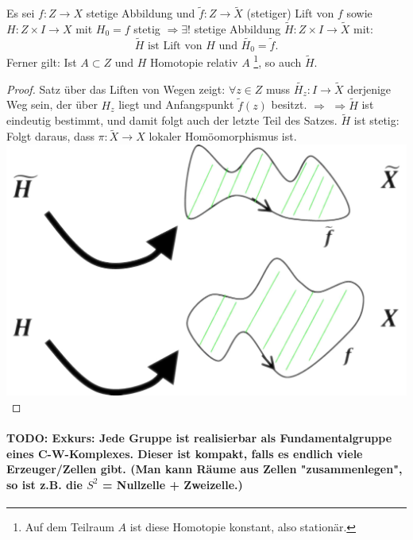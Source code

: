 \documentclass[a4paper,11pt,notitlepage]{report}
\theoremstyle{definition}
\begin{document}
\begin{theorem}
	Es sei $f \colon Z \rightarrow X$ stetige Abbildung und $\widetilde{f} \colon Z \rightarrow \widetilde{X}$ (stetiger) Lift von $f$ sowie $H \colon Z \times I \rightarrow X$ mit $H_0 = f$ stetig $\Rightarrow \exists!$ stetige Abbildung $\widetilde{H} \colon Z \times I \rightarrow \widetilde{X}$ mit:
	$$\widetilde{H} \text{ ist Lift von $H$ und $\widetilde{H_0} = \widetilde{f}$.}$$
	Ferner gilt:
	\newline
	Ist $A \subset Z$ und $H$ Homotopie relativ $A$ \footnote{Auf dem Teilraum $A$ ist diese Homotopie konstant, also stationär.}, so auch $\widetilde{H}$.
\end{theorem}

\begin{proof}
	Satz über das Liften von Wegen zeigt: \newline
	$\forall z \in Z $ muss $\widetilde{H_z} \colon I \rightarrow \widetilde{X}$ derjenige Weg sein, der über $H_z$ liegt und Anfangspunkt $\widetilde{f}(z)$ besitzt. $\Rightarrow$
	\newline
	$\Rightarrow \widetilde{H}$ ist eindeutig bestimmt, und damit folgt auch der letzte Teil des Satzes. \newline
	$\widetilde{H}$ ist stetig: Folgt daraus, dass $\pi \colon \widetilde{X} \rightarrow X$ lokaler Homöomorphismus ist. \newline
\includegraphics[scale=0.4]{images/Lift_Homotopie.png}
\end{proof}

\paragraph{TODO: Exkurs: Jede Gruppe ist realisierbar als Fundamentalgruppe eines C-W-Komplexes. Dieser ist kompakt, falls es endlich viele Erzeuger/Zellen gibt. (Man kann Räume aus Zellen "zusammenlegen", so ist z.B. die $S^2$ = Nullzelle + Zweizelle.)}
\end{document}
